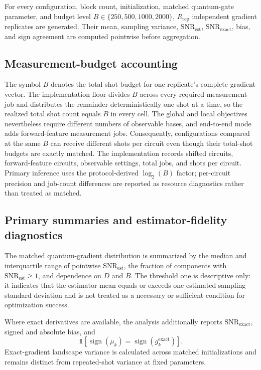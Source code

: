 \documentclass[pdflatex,sn-basic,Numbered]{sn-jnl}
\newcommand{\snrest}{\mathrm{SNR}_{\mathrm{est}}}
\newcommand{\snrexact}{\mathrm{SNR}_{\mathrm{exact}}}
\begin{document}
For every configuration, block count, initialization, matched quantum-gate parameter, and budget level $B\in\{250,500,1000,2000\}$, $R_{\mathrm{rep}}$ independent gradient replicates are generated. Their mean, sampling variance, $\snrest$, $\snrexact$, bias, and sign agreement are computed pointwise before aggregation.

\subsection{Measurement-budget accounting}
\label{sec:budget}

The symbol $B$ denotes the total shot budget for one replicate's complete gradient vector. The implementation floor-divides $B$ across every required measurement job and distributes the remainder deterministically one shot at a time, so the realized total shot count equals $B$ in every cell. The global and local objectives nevertheless require different numbers of observable bases, and end-to-end mode adds forward-feature measurement jobs. Consequently, configurations compared at the same $B$ can receive different shots per circuit even though their total-shot budgets are exactly matched. The implementation records shifted circuits, forward-feature circuits, observable settings, total jobs, and shots per circuit. Primary inference uses the protocol-derived $\log_2(B)$ factor; per-circuit precision and job-count differences are reported as resource diagnostics rather than treated as matched.

\subsection{Primary summaries and estimator-fidelity diagnostics}

The matched quantum-gradient distribution is summarized by the median and interquartile range of pointwise $\snrest$, the fraction of components with $\snrest\ge1$, and dependence on $D$ and $B$. The threshold one is descriptive only: it indicates that the estimator mean equals or exceeds one estimated sampling standard deviation and is not treated as a necessary or sufficient condition for optimization success.

Where exact derivatives are available, the analysis additionally reports $\snrexact$, signed and absolute bias, and
\[
\mathbb{1}\!\left[
\operatorname{sign}(\mu_k)
=\operatorname{sign}(g_k^{\mathrm{exact}})
\right].
\]
Exact-gradient landscape variance is calculated across matched initializations and remains distinct from repeated-shot variance at fixed parameters.
\end{document}
